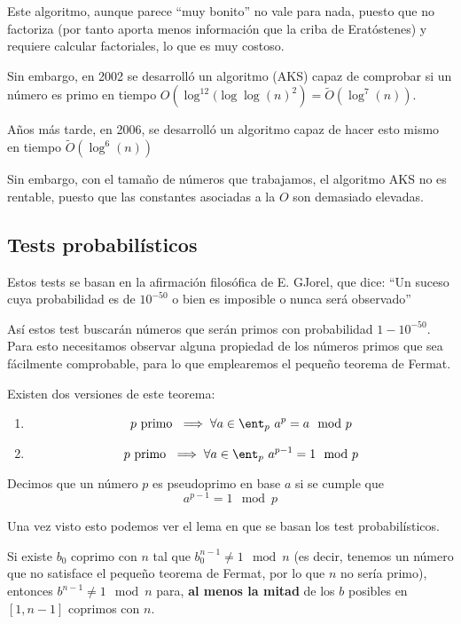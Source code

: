 Este algoritmo, aunque parece ``muy bonito'' no vale para nada, puesto que no factoriza (por tanto aporta menos información que la criba de Eratóstenes) y requiere calcular factoriales, lo que es muy costoso.

Sin embargo, en 2002 se desarrolló un algoritmo (AKS) capaz de comprobar si un número es primo en tiempo $O\left( \log^{12}(\log\log(n)^2\right)= \tilde{O}(\log^7(n))$.

Años más tarde, en 2006, se desarrolló un algoritmo capaz de hacer esto mismo en tiempo $\tilde{O}\left( \log^6(n)\right)$

Sin embargo, con el tamaño de números que trabajamos, el algoritmo AKS no es rentable, puesto que las constantes asociadas a la $O$ son demasiado elevadas.

\subsection{Tests probabilísticos}

Estos tests se basan en la afirmación filosófica de E. GJorel, que dice: ``Un suceso cuya probabilidad es de $10^{-50}$ o bien es imposible o nunca será observado''

Así estos test buscarán números que serán primos con probabilidad $1-10^{-50}$. Para esto necesitamos observar alguna propiedad de los números primos que sea fácilmente comprobable, para lo que emplearemos el pequeño teorema de Fermat.

\begin{theorem}
Existen dos versiones de este teorema:
\begin{enumerate}
\item
\[p \text{ primo } \implies \forall a \in \ent_p \ a^p=a \mod p\]

\item
\[p \text{ primo } \implies \forall a \in \ent_p \ a^{p-1}=1 \mod p\]
\end{enumerate}
\label{thm:FermatsLittleTh}
\end{theorem}

\newpage
\begin{defn}
Decimos que un número $p$ es pseudoprimo en base $a$ si se cumple que
\[a^{p-1}=1 \mod p \]
\end{defn}

Una vez visto esto podemos ver el lema en que se basan los test probabilísticos.
\begin{lemma}
Si existe $b_0$ coprimo con $n$ tal que $b_0^{n-1}\neq 1 \mod n$ (es decir, tenemos un número que no satisface el pequeño teorema de Fermat, por lo que $n$ no sería primo), entonces $b^{n-1} \neq 1 \mod n$ para, \textbf{al menos la mitad} de los $b$ posibles en $[1,n-1]$ coprimos con $n$.
\end{lemma}

